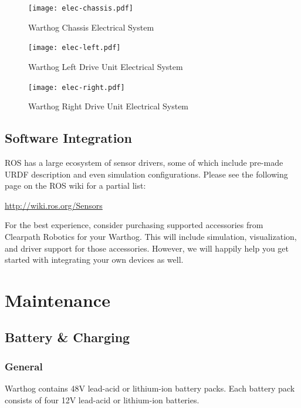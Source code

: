 \documentclass[]{clearpath-latex/clearpath-manual}
\begin{document}
\pagebreak
\begin{figure}[!htb]
  \centering
  \texttt{[image: elec-chassis.pdf]}
  \caption{Warthog Chassis Electrical System}
  \label{elec-chassis}
\end{figure}

\begin{figure}[!htb]
  \centering
  \texttt{[image: elec-left.pdf]}
  \caption{Warthog Left Drive Unit Electrical System}
  \label{elec-left}
\end{figure}

\begin{figure}[!htb]
  \centering
  \texttt{[image: elec-right.pdf]}
  \caption{Warthog Right Drive Unit Electrical System}
  \label{elec-right}
\end{figure}




\subsection{Software Integration}

ROS has a large ecosystem of sensor drivers, some of which include pre-made URDF description and even simulation configurations.  Please see the following page on the ROS wiki for a partial list:

\url{http://wiki.ros.org/Sensors}

For the best experience, consider purchasing supported accessories from Clearpath Robotics for your Warthog. This will include simulation, visualization, and driver support for those accessories.  However, we will happily help you get started with integrating your own devices as well.

\section{Maintenance}

\subsection{Battery \& Charging}

\subsubsection{General}

Warthog contains 48V lead-acid or lithium-ion battery packs. Each battery pack consists of four 12V lead-acid or lithium-ion batteries.
\end{document}
